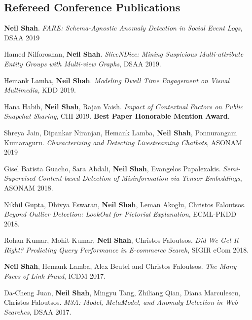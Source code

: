\documentclass{article}
\begin{document}
\subsection*{\bf {Refereed Conference Publications}}
\begin{etaremune}[itemsep=1pt,parsep=0pt]

\item {\bf Neil Shah}. \emph{FARE: Schema-Agnostic Anomaly Detection in Social Event Logs}, DSAA 2019

\item Hamed Nilforoshan, {\bf Neil Shah}.  \emph{SliceNDice: Mining Suspicious Multi-attribute Entity Groups with Multi-view Graphs}, DSAA 2019.

\item Hemank Lamba, {\bf Neil Shah}.  \emph{Modeling Dwell Time Engagement on Visual Multimedia}, KDD 2019.  

\item Hana Habib, {\bf Neil Shah}, Rajan Vaish.  \emph{Impact of Contextual Factors on Public Snapchat Sharing}, CHI 2019. {\bf Best Paper Honorable Mention Award}.

\item Shreya Jain, Dipankar Niranjan, Hemank Lamba, {\bf Neil Shah}, Ponnurangam Kumaraguru.  \emph{Characterizing and Detecting Livestreaming Chatbots}, ASONAM 2019

\item Gisel Batista Guacho, Sara Abdali, {\bf Neil Shah}, Evangelos Papalexakis.  \emph{Semi-Supervised Content-based Detection of Misinformation via Tensor Embeddings}, ASONAM 2018.  

\item Nikhil Gupta, Dhivya Eswaran, {\bf Neil Shah}, Leman Akoglu, Christos Faloutsos. \emph{Beyond Outlier Detection: LookOut for Pictorial Explanation}, ECML-PKDD 2018.

\item Rohan Kumar, Mohit Kumar, {\bf Neil Shah}, Christos Faloutsos. \emph{Did We Get It Right? Predicting Query Performance in E-commerce Search}, SIGIR eCom 2018.

\item {\bf Neil Shah}, Hemank Lamba, Alex Beutel and Christos Faloutsos. \emph{The Many Faces of Link Fraud}, ICDM 2017.

\item Da-Cheng Juan, {\bf Neil Shah}, Mingyu Tang, Zhiliang Qian, Diana Marculescu, Christos Faloutsos. \emph{M3A: Model, MetaModel, and Anomaly Detection in Web Searches}, DSAA 2017.


\end{etaremune}
\end{document}
